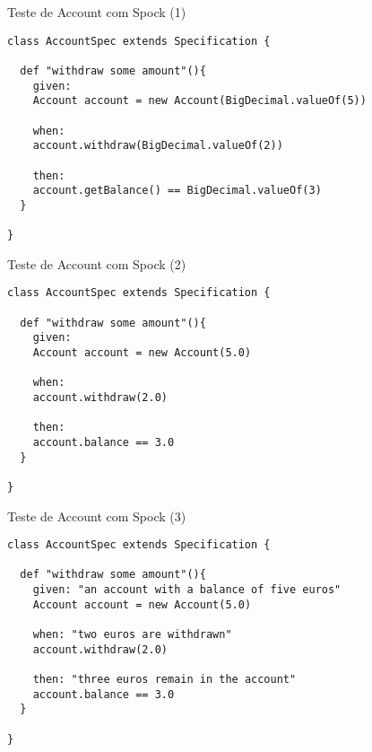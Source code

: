 \documentclass{beamer}
\begin{document}
\begin{frame}[fragile]{Teste de Account com Spock (1)}
 \begin{verbatim}
class AccountSpec extends Specification {
  
  def "withdraw some amount"(){
    given:
    Account account = new Account(BigDecimal.valueOf(5))
    
    when:
    account.withdraw(BigDecimal.valueOf(2))
    
    then:
    account.getBalance() == BigDecimal.valueOf(3) 
  }
  
}
  \end{verbatim}
\end{frame}

\begin{frame}[fragile]{Teste de Account com Spock (2)}
 \begin{verbatim}
class AccountSpec extends Specification {
  
  def "withdraw some amount"(){
    given:
    Account account = new Account(5.0)
    
    when:
    account.withdraw(2.0)
    
    then:
    account.balance == 3.0
  }
  
}
  \end{verbatim}
\end{frame}

\begin{frame}[fragile]{Teste de Account com Spock (3)}
 \begin{verbatim}
class AccountSpec extends Specification {
  
  def "withdraw some amount"(){
    given: "an account with a balance of five euros"
    Account account = new Account(5.0)
    
    when: "two euros are withdrawn"
    account.withdraw(2.0)
    
    then: "three euros remain in the account"
    account.balance == 3.0
  }
  
}
  \end{verbatim}
\end{frame}
\end{document}
